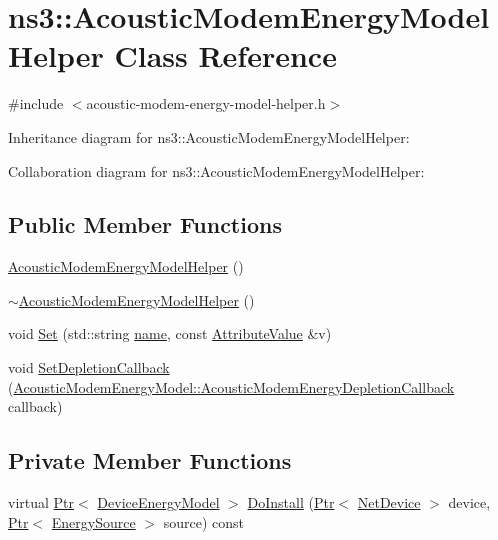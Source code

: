 \hypertarget{classns3_1_1AcousticModemEnergyModelHelper}{}\section{ns3\+:\+:Acoustic\+Modem\+Energy\+Model\+Helper Class Reference}
\label{classns3_1_1AcousticModemEnergyModelHelper}


{\ttfamily \#include $<$acoustic-\/modem-\/energy-\/model-\/helper.\+h$>$}



Inheritance diagram for ns3\+:\+:Acoustic\+Modem\+Energy\+Model\+Helper\+:


Collaboration diagram for ns3\+:\+:Acoustic\+Modem\+Energy\+Model\+Helper\+:
\subsection*{Public Member Functions}
\begin{DoxyCompactItemize}
\item 
\hyperlink{classns3_1_1AcousticModemEnergyModelHelper_af2566000591e0895a16ff726de1395e7}{Acoustic\+Modem\+Energy\+Model\+Helper} ()
\item 
\hyperlink{classns3_1_1AcousticModemEnergyModelHelper_aea2a2010c5d24bfdded50944a23093fc}{$\sim$\+Acoustic\+Modem\+Energy\+Model\+Helper} ()
\item 
void \hyperlink{classns3_1_1AcousticModemEnergyModelHelper_abc6557b5e7806af2a63c88c2c4dfb95e}{Set} (std\+::string \hyperlink{generate__test__data__lte__spectrum__model_8m_ab74e6bf80237ddc4109968cedc58c151}{name}, const \hyperlink{classns3_1_1AttributeValue}{Attribute\+Value} \&v)
\item 
void \hyperlink{classns3_1_1AcousticModemEnergyModelHelper_a9f3e874ddcc7469341aec932dae3813e}{Set\+Depletion\+Callback} (\hyperlink{classns3_1_1AcousticModemEnergyModel_a04ad0c4c5ea21dc8d221761b734c317b}{Acoustic\+Modem\+Energy\+Model\+::\+Acoustic\+Modem\+Energy\+Depletion\+Callback} callback)
\end{DoxyCompactItemize}
\subsection*{Private Member Functions}
\begin{DoxyCompactItemize}
\item 
virtual \hyperlink{classns3_1_1Ptr}{Ptr}$<$ \hyperlink{classns3_1_1DeviceEnergyModel}{Device\+Energy\+Model} $>$ \hyperlink{classns3_1_1AcousticModemEnergyModelHelper_a41d8f30d304f1431dcbd7b62ebc904da}{Do\+Install} (\hyperlink{classns3_1_1Ptr}{Ptr}$<$ \hyperlink{classns3_1_1NetDevice}{Net\+Device} $>$ device, \hyperlink{classns3_1_1Ptr}{Ptr}$<$ \hyperlink{classns3_1_1EnergySource}{Energy\+Source} $>$ source) const 
\end{DoxyCompactItemize}
